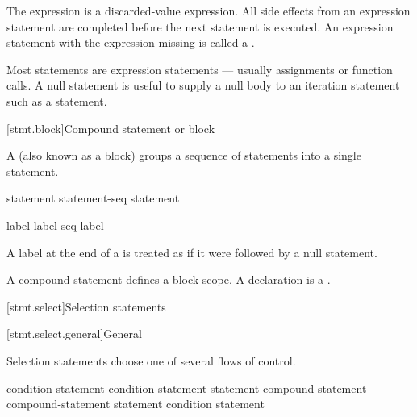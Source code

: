 The expression is
a discarded-value expression.
All
%
side effects from an expression statement
are completed before the next statement is executed.
%
An expression statement with the expression missing is called
a .
\begin{note}
Most statements are expression statements --- usually assignments or
function calls. A null statement is useful to supply a null body to an
iteration statement such as a 
statement.
\end{note}

[stmt.block]{Compound statement or block}%
%

\pnum
A  (also known as a block) groups a
sequence of statements into a single statement.

\begin{bnf}
\br
    \terminal{\{}   \terminal{\}}
\end{bnf}

\begin{bnf}
\br
    statement\br
    statement-seq statement
\end{bnf}

\begin{bnf}
\br
    label\br
    label-seq label
\end{bnf}

A label at the end of a 
is treated as if it were followed by a null statement.

\pnum
\begin{note}
A compound statement defines a block scope.
A declaration is a .
\end{note}

[stmt.select]{Selection statements}%

[stmt.select.general]{General}%

\pnum
Selection statements choose one of several flows of control.

%
%
%
\begin{bnf}
\br
      \terminal{(}  condition \terminal{)} statement\br
      \terminal{(}  condition \terminal{)} statement  statement\br
     \opt{\terminal{!}}  compound-statement\br
     \opt{\terminal{!}}  compound-statement  statement\br
     \terminal{(}  condition \terminal{)} statement
\end{bnf}

